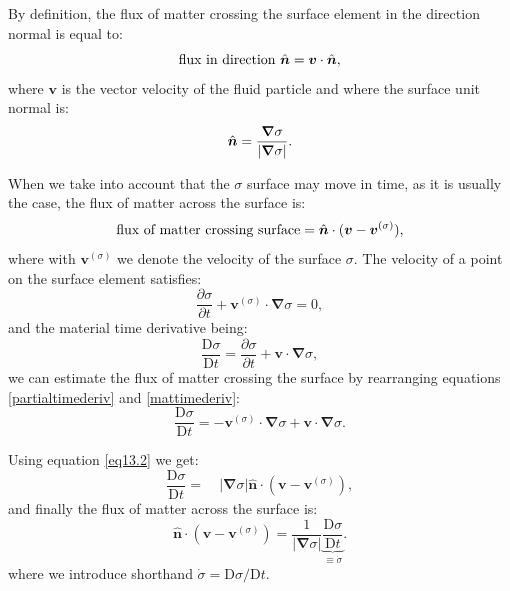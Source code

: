 By definition, the flux of matter crossing the surface element in the direction normal is equal to:
\begin{equation}
\centering
\text{flux  in  direction } \hat{\boldsymbol{n}} = \boldsymbol{v} \cdot \hat{\boldsymbol{n}},
\label{normal}
\end{equation}
where $\boldsymbol{v}$ is the vector velocity of the fluid particle and where the surface unit normal is:
\begin{equation}
\centering
\hat{\boldsymbol{n}} = \frac{\boldsymbol{\nabla} \sigma}{|\boldsymbol{\nabla} \sigma|}. \label{eq13.2}
\end{equation}

When we take into account that the $\sigma$ surface may move in time, as it is usually the case, the flux of matter across the surface is:
\begin{equation}
\centering
\text{flux of matter crossing surface} = \hat{\boldsymbol{n}} \cdot (\boldsymbol{v}-\boldsymbol{v}^{(\sigma)}),
\end{equation}
where with $\boldsymbol{v}^{(\sigma)}$ we denote the velocity of the surface $\sigma$. The velocity of a point on the surface element satisfies:
\begin{equation}
\frac{\partial \sigma}{\partial t} + \boldsymbol{v}^{(\sigma)} \cdot \boldsymbol{\nabla} \sigma = 0,
\label{partialtimederiv}
\end{equation}
and the material time derivative being:
\begin{equation}
\frac{\mathrm{D}\sigma}{\mathrm{D}t} = \frac{\partial \sigma}{\partial t} + \boldsymbol{v} \cdot \boldsymbol{\nabla} \sigma,
\label{mattimederiv}
\end{equation}
we can estimate the flux of matter crossing the surface by rearranging equations \eqref{partialtimederiv} and \eqref{mattimederiv}:
\begin{equation}
\frac{\mathrm{D}\sigma}{\mathrm{D}t} = - \boldsymbol{v}^{(\sigma)} \cdot \boldsymbol{\nabla} \sigma + \boldsymbol{v} \cdot \boldsymbol{\nabla} \sigma.
\end{equation}

Using equation \eqref{eq13.2} we get:
\begin{equation}
\frac{\mathrm{D}\sigma}{\mathrm{D}t} = \quad |\boldsymbol{\nabla} \sigma|\hat{\boldsymbol{n}} \cdot (\boldsymbol{v}-\boldsymbol{v}^{(\sigma)}),
\end{equation}
and finally the flux of matter across the surface is:
\begin{equation}
\hat{\boldsymbol{n}} \cdot (\boldsymbol{v}-\boldsymbol{v}^{(\sigma)}) = \frac{1}{|\boldsymbol{\nabla} \sigma|} \underbrace{\frac{\mathrm{D} \sigma}{\mathrm{D}t}}_{\equiv \dot{\sigma}}.
\label{fluxacrosssurf}
\end{equation}
where we introduce shorthand $\dot{\sigma}=\mathrm{D}\sigma/\mathrm{D} t$.

